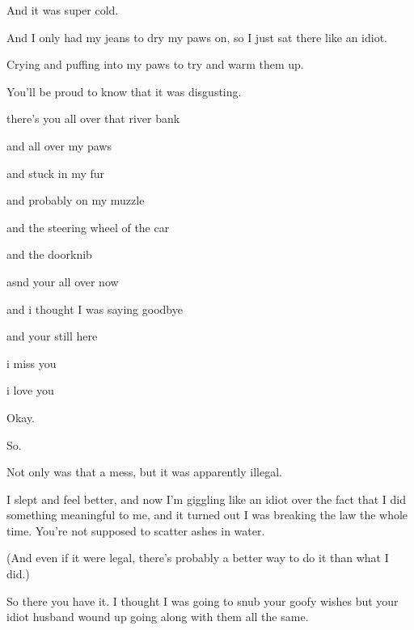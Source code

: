 { And it was super cold.

 And I only had my jeans to dry my paws on, so I just sat there like an idiot.

 Crying and puffing into my paws to try and warm them up.

 You'll be proud to know that it was disgusting.

 there's you all over that river bank

 and all over my paws

 and stuck in my fur

 and probably on my muzzle

 and the steering wheel of the car

 and the doorknib

 asnd your all over now

 and i thought I was saying goodbye

 and your still here

 i miss you

 i love you

\nopagebreak

 Okay.

 So.

 Not only was that a mess, but it was apparently illegal.

 I slept and feel better, and now I'm giggling like an idiot over the fact that I did something meaningful to me, and it turned out I was breaking the law the whole time. You're not supposed to scatter ashes in water.

(And even if it were legal, there's probably a better way to do it than what I did.)

 So there you have it. I thought I was going to snub your goofy wishes but your idiot husband wound up going along with them all the same.

\nopagebreak

}
